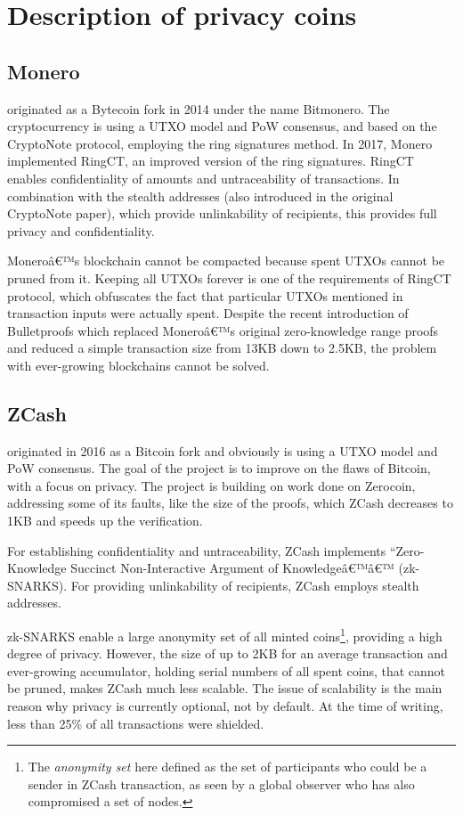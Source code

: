 \documentclass[8pt,fleqn,openany]{book}
\begin{document}
{		\section{Description of privacy coins}
		
		\subsection{Monero} originated as a Bytecoin fork in 2014 under the name Bitmonero. The cryptocurrency is using a UTXO model and PoW consensus, and based on the CryptoNote protocol\cite{c2}, employing the ring signatures method. In 2017, Monero implemented RingCT\cite{c3}, an improved version of the ring signatures. RingCT enables confidentiality of amounts and untraceability of transactions. In combination with the stealth addresses (also introduced in the original CryptoNote paper), which provide unlinkability of recipients, this provides full privacy and confidentiality.
		
		Moneroâ€™s blockchain cannot be compacted because spent UTXOs cannot be pruned from it. Keeping all UTXOs forever is one of the requirements of RingCT protocol, which obfuscates the fact that particular UTXOs mentioned in transaction inputs were actually spent. 
		Despite the recent introduction of Bulletproofs\cite{c4} which replaced Moneroâ€™s original zero-knowledge range proofs and reduced a simple transaction size from 13KB down to 2.5KB, the problem with ever-growing blockchains cannot be solved. 
		
		\subsection{ZCash} originated in 2016 as a Bitcoin fork and obviously is using a UTXO model and PoW consensus. The goal of the project is to improve on the flaws of Bitcoin, with a focus on privacy. The project is building on work done on Zerocoin\cite{c5}, addressing some of its faults, like the size of the proofs, which ZCash decreases to 1KB and speeds up the verification.
		
		For establishing confidentiality and untraceability, ZCash implements ``Zero-Knowledge Succinct Non-Interactive Argument of Knowledgeâ€™â€™ (zk-SNARKS)\cite{c6}. For providing unlinkability of recipients, ZCash employs stealth addresses.
		
		zk-SNARKS enable a large anonymity set of all minted coins\footnote{The \textit{anonymity set} here defined as the set of participants who could be a sender in ZCash transaction, as seen by a global observer who has also compromised a set of nodes.}, providing a high degree of privacy. However, the size of up to 2KB for an average transaction and ever-growing accumulator, holding serial numbers of all spent coins, that cannot be pruned, makes ZCash much less scalable. The issue of scalability is the main reason why privacy is currently optional, not by default. At the time of writing, less than 25\% of all transactions were shielded.
		
}
\end{document}
